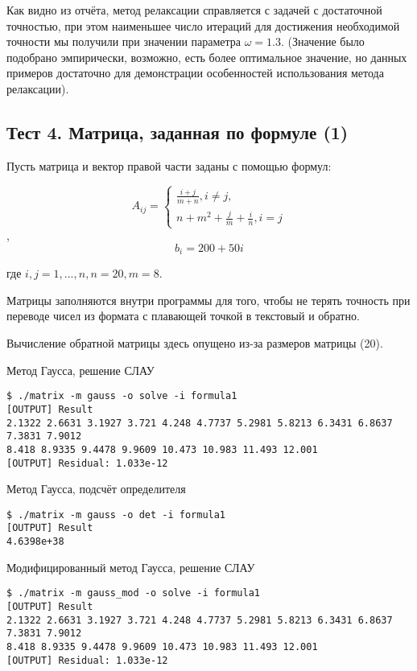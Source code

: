 \documentclass[a4paper,11pt]{report}
\begin{document}
Как видно из отчёта, метод релаксации справляется с задачей с достаточной точностью, при этом наименьшее число итераций для 
достижения необходимой точности мы получили при значении параметра $\omega = 1.3$. (Значение было подобрано эмпирически, возможно,
есть более оптимальное значение, но данных примеров достаточно для демонстрации особенностей использования метода релаксации).

\subsection*{Тест 4. Матрица, заданная по формуле (1)}

Пусть матрица и вектор правой части заданы с помощью формул:

$$A_{ij} = \begin{cases}
       \frac{i + j}{m + n}, i \neq j, \\
       n + m^2 + \frac{j}{m} + \frac{i}{n}, i = j
      \end{cases}
$$,
$$ b_i = 200 + 50i $$

где $i, j = 1,...,n, n = 20, m = 8$.

Матрицы заполняются внутри программы для того, чтобы не терять точность при переводе чисел из формата с плавающей точкой в
текстовый и обратно.

Вычисление обратной матрицы здесь опущено из-за размеров матрицы (20).

\begin{bash}
\caption{Метод Гаусса, решение СЛАУ}
\begin{verbatim}
$ ./matrix -m gauss -o solve -i formula1 
[OUTPUT] Result
2.1322 2.6631 3.1927 3.721 4.248 4.7737 5.2981 5.8213 6.3431 6.8637 7.3831 7.9012 
8.418 8.9335 9.4478 9.9609 10.473 10.983 11.493 12.001 
[OUTPUT] Residual: 1.033e-12
\end{verbatim}
\end{bash}

\begin{bash}
 \caption{Метод Гаусса, подсчёт определителя}
 \begin{verbatim}
$ ./matrix -m gauss -o det -i formula1 
[OUTPUT] Result
4.6398e+38
 \end{verbatim}
\end{bash}

\begin{bash}
\caption{Модифицированный метод Гаусса, решение СЛАУ}
\begin{verbatim}
$ ./matrix -m gauss_mod -o solve -i formula1 
[OUTPUT] Result
2.1322 2.6631 3.1927 3.721 4.248 4.7737 5.2981 5.8213 6.3431 6.8637 7.3831 7.9012
8.418 8.9335 9.4478 9.9609 10.473 10.983 11.493 12.001 
[OUTPUT] Residual: 1.033e-12
\end{verbatim}
\end{bash}
\end{document}
